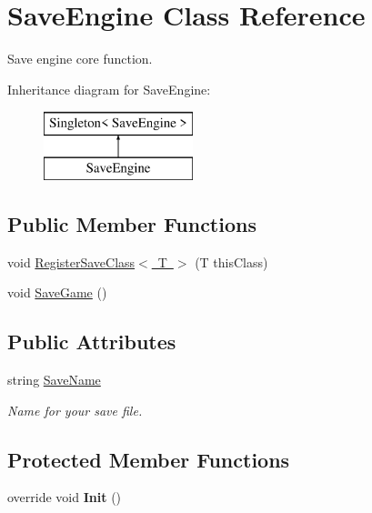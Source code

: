 \hypertarget{class_save_engine}{}\section{Save\+Engine Class Reference}
\label{class_save_engine}


Save engine core function.  


Inheritance diagram for Save\+Engine\+:\begin{figure}[H]
\begin{center}
\leavevmode
\includegraphics[height=2.000000cm]{class_save_engine}
\end{center}
\end{figure}
\subsection*{Public Member Functions}
\begin{DoxyCompactItemize}
\item 
void \mbox{\hyperlink{class_save_engine_aa1fc764f73e31736440014553f49ec1d}{Register\+Save\+Class$<$ T $>$}} (T this\+Class)
\item 
void \mbox{\hyperlink{class_save_engine_a39f4a03af6103bc9f327ba434c7d33a1}{Save\+Game}} ()
\end{DoxyCompactItemize}
\subsection*{Public Attributes}
\begin{DoxyCompactItemize}
\item 
\mbox{\label{class_save_engine_aa7b27b629384a9039a8a1fce7d2cdd2c}} 
string \mbox{\hyperlink{class_save_engine_aa7b27b629384a9039a8a1fce7d2cdd2c}{Save\+Name}}
\begin{DoxyCompactList}\small\item\em Name for your save file. \end{DoxyCompactList}\end{DoxyCompactItemize}
\subsection*{Protected Member Functions}
\begin{DoxyCompactItemize}
\item 
\mbox{\label{class_save_engine_a7acdd7c43a03ed9d92be36626e11d231}} 
override void {\bfseries Init} ()
\end{DoxyCompactItemize}


